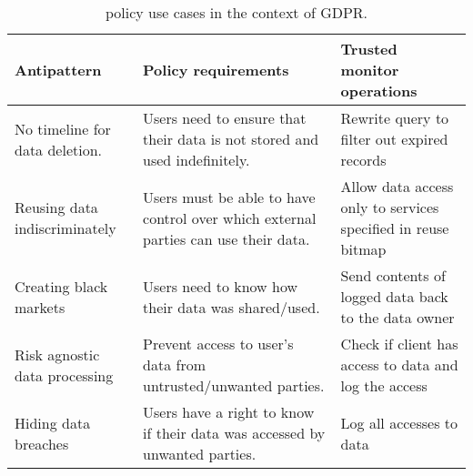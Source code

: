 \begin{table*}[t]\small
\setlength\tabcolsep{4pt}
\centering
\begin{tabular}{p{3cm} p{7cm} p{5cm}}

\bfseries Antipattern & \bfseries Policy requirements & \bfseries Trusted monitor operations \\

\hline
 No timeline for data deletion. & Users need to ensure that their data is not stored and used indefinitely. & Rewrite query to filter out expired records \\
 \hline
  Reusing data indiscriminately & Users must be able to have control over which external parties can use their data. & Allow data access only to services specified in reuse bitmap \\
 \hline
  Creating black markets & Users need to know how their data was shared/used. & Send contents of logged data back to the data owner \\
 \hline
  Risk agnostic data processing & Prevent access to user's data from untrusted/unwanted parties. & Check if client has access to data and log the access \\
 \hline
  Hiding data breaches & Users have a right to know if their data was accessed by unwanted parties. & Log all accesses to data \\
 \hline

\end{tabular}
\vspace{1mm}
\caption{\small \project{} policy use cases in the context of GDPR.}\label{tab:gdpr-antipatterns}
\vspace{-5mm}
\end{table*}
